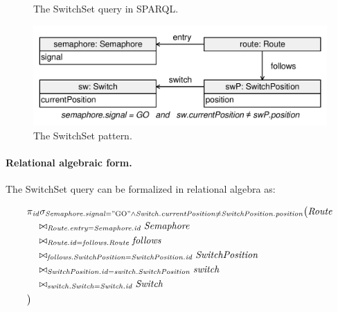 \begin{figure}[htb]
\centering
\begin{minipage}{0.9\textwidth}
  { \alignListing
    }
  \caption{The \textsf{SwitchSet} query in SPARQL.}
  \label{lst:switchset-sparql}
\end{minipage}
\end{figure}


\begin{figure}[htb]
	\centering
	\includegraphics[scale=0.4]{figures/pattern-switchset}
	\caption{The \textsf{SwitchSet} pattern.}
	\label{fig:pattern-switchset}
\end{figure}

\paragraph{Relational algebraic form.} The \textsf{SwitchSet} query can be formalized in relational algebra as:

\begin{align*}
& \pi_{\mathit{id}} \sigma_{\mathit{Semaphore}.\mathit{signal} = \mathrm{"GO"} \wedge \mathit{Switch}.\mathit{currentPosition} \neq \mathit{SwitchPosition}.\mathit{position}} \big( \mathit{Route} \\
& \quad \bowtie_{\mathit{Route}.\mathit{entry} = \mathit{Semaphore}.\mathit{id}} \mathit{Semaphore} \\
& \quad \bowtie_{\mathit{Route}.\mathit{id} = \mathit{follows}.\mathit{Route}} \mathit{follows} \\
& \quad \bowtie_{\mathit{follows}.\mathit{SwitchPosition} = \mathit{SwitchPosition}.\mathit{id}} \mathit{SwitchPosition} \\
& \quad \bowtie_{\mathit{SwitchPosition}.\mathit{id} = \mathit{switch}.\mathit{SwitchPosition}} \mathit{switch} \\
& \quad \bowtie_{\mathit{switch}.\mathit{Switch} = \mathit{Switch}.\mathit{id}} \mathit{Switch} \\
& \big)
\end{align*}

